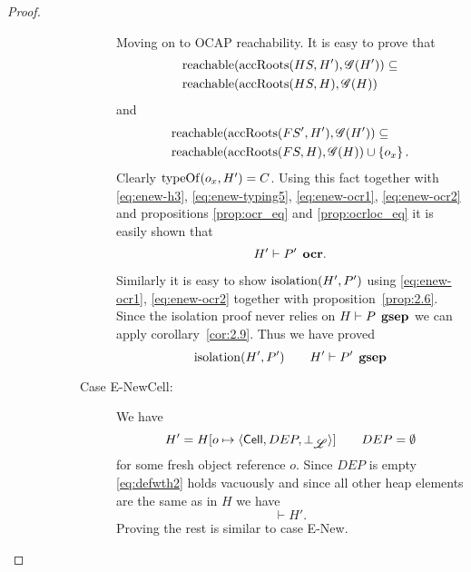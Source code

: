 \begin{proof}
\begin{description}
\begin{description}
\begin{description}
              Moving on to OCAP reachability. It is easy to prove that
              \begin{equation} \label{eq:enew-ocr1}
                \begin{aligned}
                  &\mbox{$\mathrm{reachable}$}(\mbox{$\mathrm{accRoots}$}(HS, H'), \mathscr{G}(H')) \subseteq \\
                  &\mbox{$\mathrm{reachable}$}(\mbox{$\mathrm{accRoots}$}(HS, H), \mathscr{G}(H)) 
                \end{aligned}
              \end{equation}
              and
              \begin{equation} \label{eq:enew-ocr2}
                \begin{aligned}
                  &\mbox{$\mathrm{reachable}$}(\mbox{$\mathrm{accRoots}$}(FS', H'), \mathscr{G}(H')) \subseteq \\
                  &\mbox{$\mathrm{reachable}$}(\mbox{$\mathrm{accRoots}$}(FS, H), \mathscr{G}(H)) \cup \left\{ o_x
                  \right\}.
                \end{aligned}
              \end{equation}
              Clearly $\mbox{$\mathrm{typeOf}$}(o_x, H') = C$. Using this fact together with
              \eqref{eq:enew-h3}, \eqref{eq:enew-typing5}, \eqref{eq:enew-ocr1},
              \eqref{eq:enew-ocr2} and propositions \ref{prop:ocr_eq} and
              \ref{prop:ocrloc_eq} it is easily shown that
              \begin{equation}
                H' \vdash P' \:\: \mbox{\bf ocr}.
              \end{equation}

              Similarly it is easy to show $\mbox{$\mathrm{isolation}$}(H', P')$ using
              \eqref{eq:enew-ocr1}, \eqref{eq:enew-ocr2} together with
              proposition~\ref{prop:2.6}. Since the isolation proof never relies
              on $H \vdash P \:\: \mbox{\bf gsep}$ we can apply
              corollary~\ref{cor:2.9}. Thus we have proved
              \begin{equation}
                \mbox{$\mathrm{isolation}$}(H', P') \quad\quad H' \vdash P' \:\: \mbox{\bf gsep}
              \end{equation}

            \item[Case {\sc E-NewCell}:] We have
              \begin{equation}
                H' = H[o \mapsto \mbox{$\langle \mbox{$\mathsf{Cell}$}{}, DEP, \bot_{\mbox{$\mathscr{L}$}} \rangle$}] \quad\quad DEP = \emptyset
              \end{equation}
              for some fresh object reference $o$. 
              Since $DEP$ is empty \eqref{eq:defwth2} holds vacuously and since
              all other heap elements are the same as in $H$ we have
              \begin{equation}
                \vdash H'.
              \end{equation}
              Proving the rest is similar to case {\sc E-New}.


\end{description}
\end{description}
\end{description}
\end{proof}
